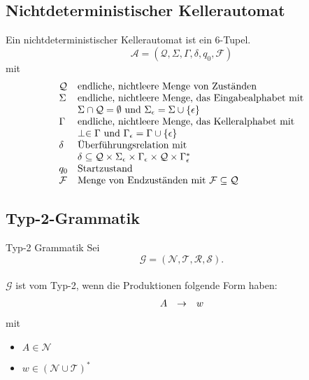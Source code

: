 \documentclass[]{beamer}
\begin{document}
\subsection{Nichtdeterministischer Kellerautomat}
\begin{frame}[squeeze]{}
  \begin{definition}
    Ein nichtdeterministischer Kellerautomat ist ein 6-Tupel.
    \[\mathcal{A} = (\mathcal{Q}, \Sigma, \Gamma, \delta, q_0, \mathcal{F})\]
    mit
    \[\begin{array}{l l}
        \mathcal{Q} & \text{endliche, nichtleere Menge von Zuständen} \\
        \Sigma      & \text{endliche, nichtleere Menge, das Eingabealphabet mit} \\
                    & \Sigma \cap \mathcal{Q} = \emptyset \text{ und } \Sigma_\epsilon = \Sigma \cup \{\epsilon\} \\
        \Gamma      & \text{endliche, nichtleere Menge, das Kelleralphabet mit} \\
                    & \perp \in \Gamma \text{ und } \Gamma_\epsilon = \Gamma \cup \{\epsilon\} \\
        \delta      & \text{Überführungsrelation mit } \\
                    & \delta \subseteq \mathcal{Q} \times \Sigma_\epsilon \times \Gamma_\epsilon \times \mathcal{Q} \times \Gamma_\epsilon^*\\
        q_0         & \text{Startzustand} \\
        \mathcal{F} & \text{Menge von Endzuständen mit } \mathcal{F} \subseteq \mathcal{Q} \\
      \end{array}\]
  \end{definition}
\end{frame}

\subsection{Typ-2-Grammatik}
\begin{frame}[squeeze]{}
  \begin{block}{Typ-2 Grammatik}
    Sei 
    \[\mathcal{G = (N, T, R, S)}.\] \\
    $\mathcal{G}$ ist vom Typ-2, wenn die Produktionen folgende Form haben:
    \[\begin{array}{l c l}
        A & \rightarrow & w \\
      \end{array}\]
    mit
    \begin{itemize}
      \item $A \in \mathcal{N}$
      \item $w \in (\mathcal{N} \cup \mathcal{T})^*$
    \end{itemize}
  \end{block}
\end{frame}
\end{document}
